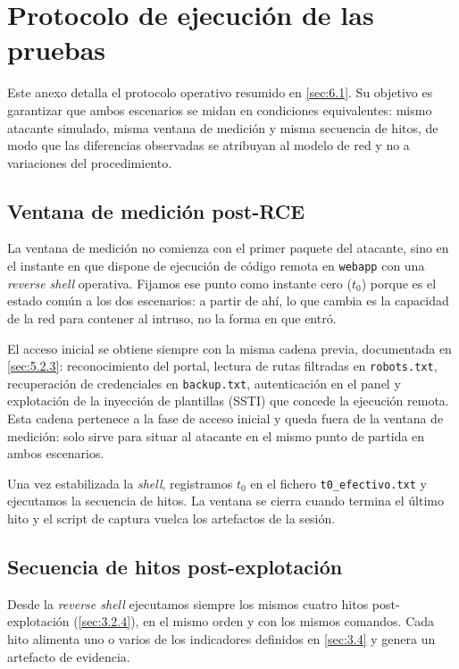 \documentclass[11pt,spanish,listoffigures,listoftables]{tfgetsinf}
\begin{document}
\chapter{Protocolo de ejecución de las pruebas}
\label{anexo:protocolo_ejecucion}

Este anexo detalla el protocolo operativo resumido en \cref{sec:6.1}. Su objetivo es garantizar que ambos escenarios se midan en condiciones equivalentes: mismo atacante simulado, misma ventana de medición y misma secuencia de hitos, de modo que las diferencias observadas se atribuyan al modelo de red y no a variaciones del procedimiento.

\section{Ventana de medición post-RCE}

La ventana de medición no comienza con el primer paquete del atacante, sino en el instante en que dispone de ejecución de código remota en \texttt{webapp} con una \textit{reverse shell} operativa. Fijamos ese punto como instante cero ($t_0$) porque es el estado común a los dos escenarios: a partir de ahí, lo que cambia es la capacidad de la red para contener al intruso, no la forma en que entró.

El acceso inicial se obtiene siempre con la misma cadena previa, documentada en \cref{sec:5.2.3}: reconocimiento del portal, lectura de rutas filtradas en \texttt{robots.txt}, recuperación de credenciales en \texttt{backup.txt}, autenticación en el panel y explotación de la inyección de plantillas (SSTI) que concede la ejecución remota. Esta cadena pertenece a la fase de acceso inicial y queda fuera de la ventana de medición: solo sirve para situar al atacante en el mismo punto de partida en ambos escenarios.

Una vez estabilizada la \textit{shell}, registramos $t_0$ en el fichero \texttt{t0\_efectivo.txt} y ejecutamos la secuencia de hitos. La ventana se cierra cuando termina el último hito y el script de captura vuelca los artefactos de la sesión.

\section{Secuencia de hitos post-explotación}

Desde la \textit{reverse shell} ejecutamos siempre los mismos cuatro hitos post-explotación (\cref{sec:3.2.4}), en el mismo orden y con los mismos comandos. Cada hito alimenta uno o varios de los indicadores definidos en \cref{sec:3.4} y genera un artefacto de evidencia.
\end{document}
